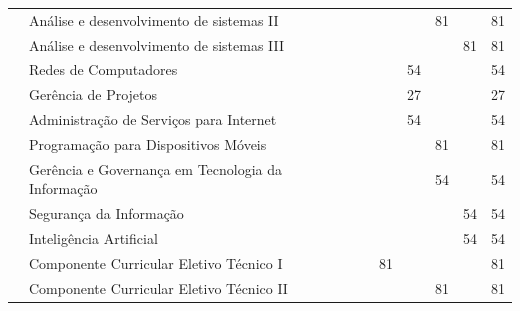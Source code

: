 \documentclass[11pt,fleqn]{book} %
\begin{document}
\begin{table}[]
{\begin{tabular}{|l|l|c|c|c|c|c|c|}
				& Análise e desenvolvimento de sistemas II      &                      &                      &                      & 81                   &                      & 81            \\ \cline{2-8} 
				& Análise e desenvolvimento de sistemas III     &                      &                      &                      &                      & 81                   & 81            \\ \cline{2-8} 
				& Redes de Computadores                         &                      &                      & 54                   &                      &                      & 54            \\ \cline{2-8} 
				& Gerência de Projetos                          &                      &                      & 27                   &                      &                      & 27            \\ \cline{2-8} 
				& Administração de Serviços para Internet       &                      &                      & 54                   &                      &                      & 54            \\ \cline{2-8} 
				& Programação para Dispositivos Móveis          &                      &                      &                      & 81                   &                      & 81            \\ \cline{2-8} 
				& Gerência e Governança em Tecnologia da Informação                    &                      &                      &                      & 54                   &                      & 54            \\ \cline{2-8} 
				& Segurança da Informação                       &                      &                      &                      &                      & 54                   & 54            \\ \cline{2-8} 
				& Inteligência Artificial        &                      &                      &                      &                      & 54                   & 54            \\ \cline{2-8} 
				& Componente Curricular Eletivo Técnico I       &                      & 81                   &                      &                      &                      & 81            \\ \cline{2-8} 
				& Componente Curricular Eletivo Técnico II      &                      &                      &                      & 81                   &                      & 81            \\ \cline{2-8} 

\end{tabular}}
\end{table}
\end{document}
